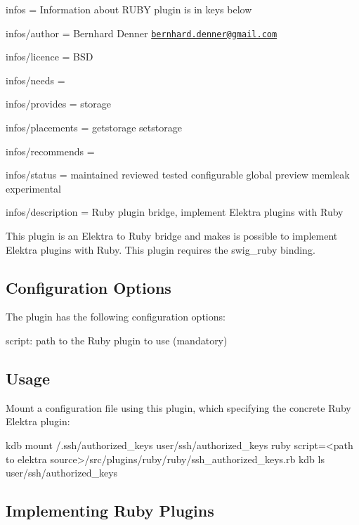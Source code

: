 
\begin{DoxyItemize}
\item infos = Information about R\+U\+BY plugin is in keys below
\item infos/author = Bernhard Denner \href{mailto:bernhard.denner@gmail.com}{\tt bernhard.\+denner@gmail.\+com}
\item infos/licence = B\+SD
\item infos/needs =
\item infos/provides = storage
\item infos/placements = getstorage setstorage
\item infos/recommends =
\item infos/status = maintained reviewed tested configurable global preview memleak experimental
\item infos/description = Ruby plugin bridge, implement Elektra plugins with Ruby
\end{DoxyItemize}

This plugin is an Elektra to Ruby bridge and makes is possible to implement Elektra plugins with Ruby. This plugin requires the {\ttfamily swig\+\_\+ruby} binding.

\subsection*{Configuration Options}

The plugin has the following configuration options\+:


\begin{DoxyItemize}
\item {\ttfamily script}\+: path to the Ruby plugin to use (mandatory)
\end{DoxyItemize}

\subsection*{Usage}

Mount a configuration file using this plugin, which specifying the concrete Ruby Elektra plugin\+:


\begin{DoxyCode}
kdb mount /.ssh/authorized\_keys user/ssh/authorized\_keys ruby script=<path to elektra
source>/src/plugins/ruby/ruby/ssh\_authorized\_keys.rb
kdb ls user/ssh/authorized\_keys
\end{DoxyCode}


\subsection*{Implementing Ruby Plugins}

